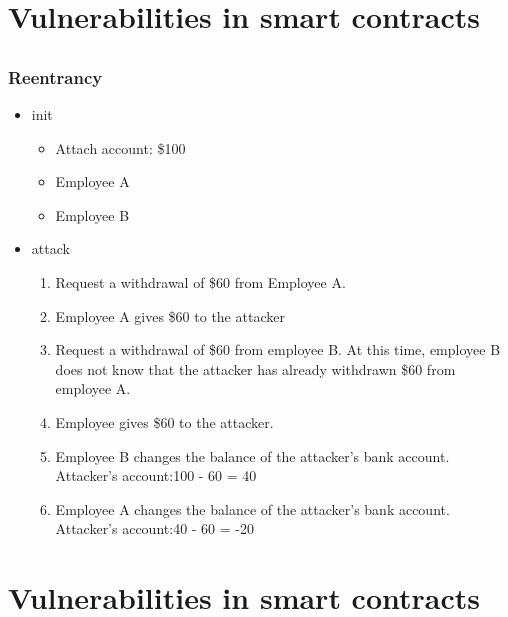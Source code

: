 \documentclass[notheorems, aspectratio=54]{beamer}
\begin{document}

\section{Vulnerabilities in smart contracts}
\subsection{}
\begin{frame}
    \frametitle{Reentrancy}

    \begin{itemize}
        \item init
        \begin{itemize}
            \item Attach account: \$100
            \item Employee A
            \item Employee B
        \end{itemize}
        \item attack
        \begin{enumerate}
            \item Request a withdrawal of \$60 from Employee A.
            \item Employee A gives \$60 to the attacker
            \item Request a withdrawal of \$60 from employee B. At this time, employee B does not know that the attacker has already withdrawn \$60 from employee A.
            \item Employee  gives \$60 to the attacker.
            \item Employee B changes the balance of the attacker's bank account. Attacker's account:100 - 60 = 40
            \item Employee A changes the balance of the attacker's bank account. Attacker's account:40 - 60 = -20
        \end{enumerate}
    \end{itemize}

\end{frame}


\section{Vulnerabilities in smart contracts}
\end{document}
